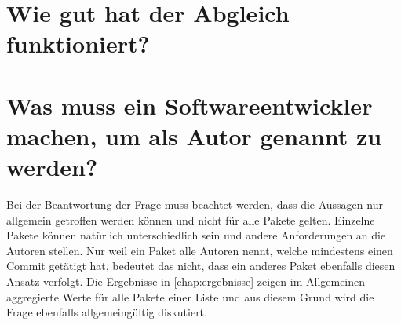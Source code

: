 \section{Wie gut hat der Abgleich funktioniert?}
\label{sec:abgleich_diskussion}

\section{Was muss ein Softwareentwickler machen, um als Autor genannt zu werden?}
\label{sec:zitationsfaehiger_autor_diskussion}
Bei der Beantwortung der Frage muss beachtet werden, dass die Aussagen nur allgemein getroffen werden können und nicht für alle Pakete gelten.
Einzelne Pakete können natürlich unterschiedlich sein und andere Anforderungen an die Autoren stellen.
Nur weil ein Paket alle Autoren nennt, welche mindestens einen Commit getätigt hat, bedeutet das nicht, dass ein anderes Paket ebenfalls diesen Ansatz verfolgt.
Die Ergebnisse in \autoref{chap:ergebnisse} zeigen im Allgemeinen aggregierte Werte für alle Pakete einer Liste und aus diesem Grund wird die Frage ebenfalls allgemeingültig diskutiert.

